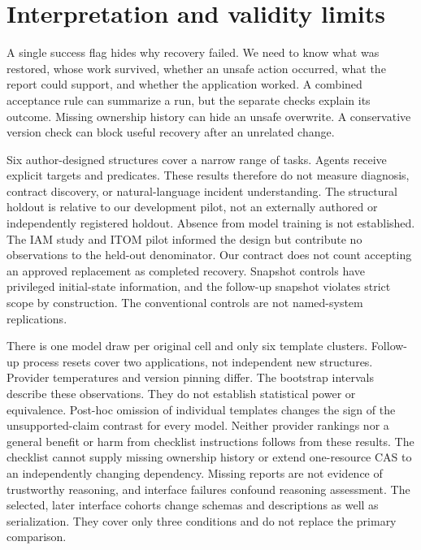 \documentclass[conference,10pt]{IEEEtran}
\begin{document}
\section{Interpretation and validity limits}

A single success flag hides why recovery failed. We need to know what was restored, whose work survived, whether an unsafe action occurred, what the report could support, and whether the application worked. A combined acceptance rule can summarize a run, but the separate checks explain its outcome. Missing ownership history can hide an unsafe overwrite. A conservative version check can block useful recovery after an unrelated change.

Six author-designed structures cover a narrow range of tasks. Agents receive explicit targets and predicates. These results therefore do not measure diagnosis, contract discovery, or natural-language incident understanding. The structural holdout is relative to our development pilot, not an externally authored or independently registered holdout. Absence from model training is not established. The IAM study and ITOM pilot informed the design but contribute no observations to the held-out denominator. Our contract does not count accepting an approved replacement as completed recovery. Snapshot controls have privileged initial-state information, and the follow-up snapshot violates strict scope by construction. The conventional controls are not named-system replications.

There is one model draw per original cell and only six template clusters. Follow-up process resets cover two applications, not independent new structures. Provider temperatures and version pinning differ. The bootstrap intervals describe these observations. They do not establish statistical power or equivalence. Post-hoc omission of individual templates changes the sign of the unsupported-claim contrast for every model. Neither provider rankings nor a general benefit or harm from checklist instructions follows from these results. The checklist cannot supply missing ownership history or extend one-resource CAS to an independently changing dependency. Missing reports are not evidence of trustworthy reasoning, and interface failures confound reasoning assessment. The selected, later interface cohorts change schemas and descriptions as well as serialization. They cover only three conditions and do not replace the primary comparison.
\end{document}
